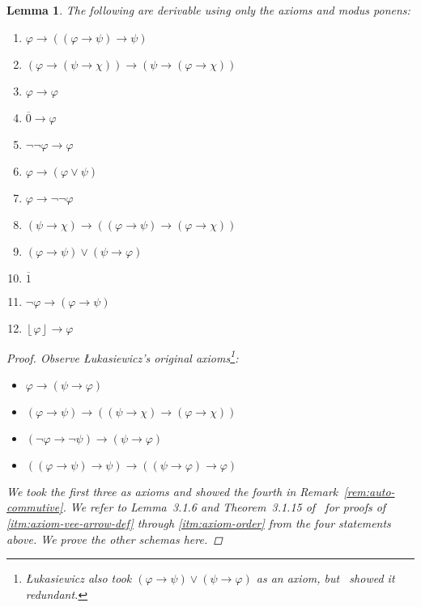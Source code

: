 \documentclass{amsart}
\newtheorem{lemma}[theorem]{Lemma}
\theoremstyle{definition}
\numberwithin{equation}{theorem}
\renewcommand{\phi}{\varphi}
\newcommand{\strict}[1]{{\left\lfloor#1\right\rfloor}}
\newcommand{\rat}[1]{{\overline{#1}}}
\newcommand{\narrow}[1]{\xrightarrow{#1}}
\renewcommand{\to}{\narrow{}}
\begin{document}
\begin{lemma}\label{lem:near-axioms}
  The following are derivable using only the axioms and modus ponens:
  \begin{enumerate}[label=(PL\arabic*), font=\normalfont]
  \item\label{itm:axiom-vee-arrow-def}$\phi\to((\phi\to\psi)\to\psi)$
  	\item\label{itm:axiom-swap}$(\phi\to(\psi\to\chi))\to(\psi\to(\phi\to\chi))$
  \item\label{itm:axiom-id-arrow} $\phi\to\phi$
  \item\label{itm:axiom-0-arrow} $\rat0\to\phi$
  \item\label{itm:axiom-classic}$\neg\neg\phi\to\phi$
  \item\label{itm:axiom-vee-arrow} $\phi\to(\phi\vee\psi)$
  \item\label{itm:axiom-rev-classic} $\phi\to\neg\neg\phi$
  \item\label{itm:axiom-rev-trans} $(\psi\to\chi)\to((\phi\to\psi)\to(\phi\to\chi))$
  \item\label{itm:axiom-order}$(\phi\to\psi)\vee(\psi\to\phi)$
  \item\label{itm:axiom-1} $\rat 1$
  \item\label{itm:axiom-arrow-explode} $\neg\phi\to(\phi\to\psi)$
  \item\label{itm:axiom-strict-arrow} $\strict\phi\to\phi$
  \end{enumerate}
  \begin{proof}
    Observe {\L}ukasiewicz's original axioms\footnote{{\L}ukasiewicz also took $(\phi\to\psi)\vee(\psi\to\phi)$ as an axiom, but~\cite{chang1958proof} showed it redundant.}:
    \begin{itemize}
    \item $\phi\to(\psi\to\phi)$
    \item $(\phi\to\psi)\to((\psi\to\chi)\to(\phi\to\chi))$
    \item $(\neg\phi\to\neg\psi)\to(\psi\to\phi)$
    \item $((\phi\to\psi)\to\psi)\to((\psi\to\phi)\to\phi)$
    \end{itemize}
    We took the first three as axioms and showed the fourth in Remark~\ref{rem:auto-commutive}.
    We refer to Lemma~3.1.6 and Theorem~3.1.15 of~\cite{hajek1998metamathematics} for proofs of \ref{itm:axiom-vee-arrow-def} through \ref{itm:axiom-order} from the four statements above.
    We prove the other schemas here.
    

\end{proof}
\end{lemma}
\end{document}
